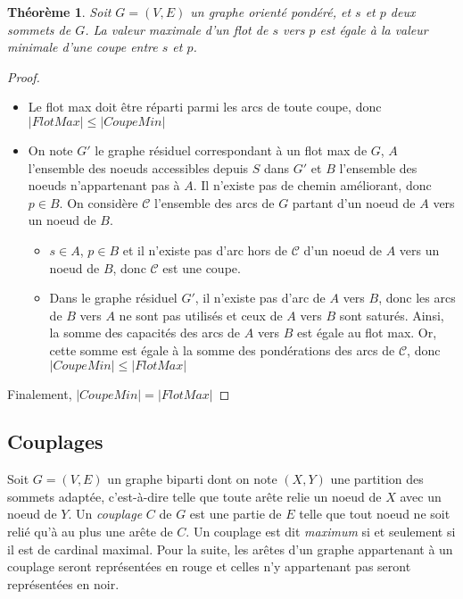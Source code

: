 \documentclass[11pt,a4paper]{article}
\newtheorem*{theorem}{Théorème} %
\begin{document}
\begin{theorem}
Soit \(G=(V,E)\) un graphe orienté pondéré, et \(s\) et \(p\) deux sommets de \(G\). La valeur maximale d'un flot de \(s\) vers \(p\) est égale à la valeur minimale d'une coupe entre \(s\) et \(p\).
\end{theorem}
\begin{proof}\leavevmode
  \begin{itemize}
    \item Le flot max doit être réparti parmi les arcs de toute coupe, donc \( \left| FlotMax \right| \leq \left| CoupeMin \right| \)
    \item On note \(G'\) le graphe résiduel correspondant à un flot max de \(G\), \(A\) l'ensemble des noeuds accessibles depuis \(S\) dans \(G'\) et \(B\) l'ensemble des noeuds n'appartenant pas à \(A\). Il n'existe pas de chemin améliorant, donc \(p \in B\). On considère \(\mathcal{C}\) l'ensemble des arcs de \(G\) partant d'un noeud de \(A\) vers un noeud de \(B\).
    \begin{itemize}
        \item \(s \in A\), \(p \in B\) et il n'existe pas d'arc hors de \(\mathcal{C}\) d'un noeud de \(A\) vers un noeud de \(B\), donc \(\mathcal{C}\) est une coupe.
        \item Dans le graphe résiduel \(G'\), il n'existe pas d'arc de \(A\) vers \(B\), donc les arcs de \(B\) vers \(A\) ne sont pas utilisés et ceux de \(A\) vers \(B\) sont saturés. Ainsi, la somme des capacités des arcs de \(A\) vers \(B\) est égale au flot max. Or, cette somme est égale à la somme des pondérations des arcs de \(\mathcal{C}\), donc \( \left| CoupeMin \right| \leq \left| FlotMax \right| \)
    \end{itemize}
  \end{itemize}
  Finalement, \( \left| CoupeMin \right| = \left| FlotMax \right| \)
\end{proof}


    \subsection{Couplages}
Soit \(G=(V,E)\) un graphe biparti dont on note \((X,Y)\) une partition des sommets adaptée, c'est-à-dire telle que toute arête relie un noeud de \(X\) avec un noeud de \(Y\). Un \textit{couplage} \(C\) de \(G\) est une partie de \(E\) telle que tout noeud ne soit relié qu'à au plus une arête de \(C\). Un couplage est dit \textit{maximum} si et seulement si il est de cardinal maximal. Pour la suite, les arêtes d'un graphe appartenant à un couplage seront représentées en rouge et celles n'y appartenant pas seront représentées en noir.
\end{document}
